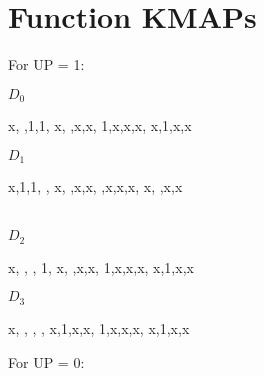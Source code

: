\documentclass[11pt,a4paper,english]{article}
\begin{document}
\pagebreak
\section{Function KMAPs}

For UP = 1: \\

    \begin{centering}
        $D_{0}$
        \begin{Karnaugh}
            \contingut
            {
                x, ,1,1,
                x, ,x,x,
                1,x,x,x,
                x,1,x,x
            }
        \end{Karnaugh}
        $D_1$
        \begin{Karnaugh}
            \contingut
            {
                x,1,1, ,
                x, ,x,x,
                 ,x,x,x,
                x, ,x,x
            }
        \end{Karnaugh}
        \\
        $D_2$
        \begin{Karnaugh}
            \contingut
            {
                x, , , 1,
                x, ,x,x,
                1,x,x,x,
                x,1,x,x
            }
        \end{Karnaugh}
        $D_3$
        \begin{Karnaugh}
            \contingut
            {
                x, , , ,
                x,1,x,x,
                1,x,x,x,
                x,1,x,x
            }
        \end{Karnaugh}     

    \end{centering}
    
For UP = 0: \\
\end{document}
